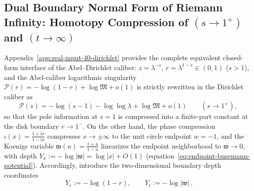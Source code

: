 \subsection{Dual Boundary Normal Form of Riemann Infinity: Homotopy Compression of \texorpdfstring{$(s\to 1^{+})$}{(s->1+)} and \texorpdfstring{$(t\to\infty)$}{(t->infty)}}\label{subsec:riemann-infinity-dual-boundary}
Appendix~\ref{app:real-input-40-dirichlet} provides the complete equivalent closed-form interface of the Abel--Dirichlet caliber: \(z=\lambda^{-s}\), \(r=\lambda^{1-s}\in(0,1)\) (\(s>1\)), and the Abel-caliber logarithmic singularity \(\mathcal{P}(r)=-\log(1-r)+\log\mathfrak{M}+o(1)\) is strictly rewritten in the Dirichlet caliber as
\[
\mathcal{P}(s)=-\log(s-1)-\log\log\lambda+\log\mathfrak{M}+o(1)\qquad(s\to 1^{+}),
\]
so that the pole information at \(s=1\) is compressed into a finite-part constant at the disk boundary \(r\to 1^{-}\).
On the other hand, the phase compression \(\iota(x)=\frac{1+\mathrm{i}x}{1-\mathrm{i}x}\) compresses \(x\to\pm\infty\) to the unit circle endpoint \(w=-1\), and the Koenigs variable \(\mathfrak{w}(u)=\frac{1+u}{1-u}\) linearizes the endpoint neighborhood to \(\mathfrak{w}\to 0\), with depth \(Y_x:=-\log|\mathfrak{w}|=\log|x|+O(1)\) (equation~\eqref{eq:endpoint-busemann-potential}).
Accordingly, introduce the two-dimensional boundary depth coordinates
\begin{equation}\label{eq:dual-boundary-depth-coords}
\boxed{\ Y_r:=-\log(1-r),\qquad Y_t:=-\log|\mathfrak{w}|\ }.
\end{equation}

